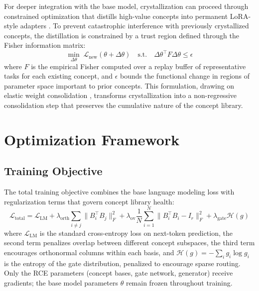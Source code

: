 \documentclass[11pt]{article}
\begin{document}
For deeper integration with the base model, crystallization can proceed through constrained optimization that distills high-value concepts into permanent LoRA-style adapters \cite{hu2022lora}. To prevent catastrophic interference with previously crystallized concepts, the distillation is constrained by a trust region defined through the Fisher information matrix:
\begin{equation}
\min_{\Delta\theta}\; \mathcal{L}_{\text{new}}(\theta + \Delta\theta) \quad \text{s.t.} \quad \Delta\theta^\top F \Delta\theta \leq \epsilon
\label{eq:crystal}
\end{equation}
where $F$ is the empirical Fisher computed over a replay buffer of representative tasks for each existing concept, and $\epsilon$ bounds the functional change in regions of parameter space important to prior concepts. This formulation, drawing on elastic weight consolidation \cite{kirkpatrick2017ewc}, transforms crystallization into a non-regressive consolidation step that preserves the cumulative nature of the concept library.

\section{Optimization Framework}

\subsection{Training Objective}

The total training objective combines the base language modeling loss with regularization terms that govern concept library health:
\begin{equation}
\mathcal{L}_{\text{total}} = \mathcal{L}_{\text{LM}} + \lambda_{\text{orth}} \sum_{i \neq j} \|B_i^\top B_j\|_F^2 + \lambda_{\text{ov}} \frac{1}{N}\sum_{i=1}^N \|B_i^\top B_i - I_r\|_F^2 + \lambda_{\text{gate}} \mathcal{H}(g)
\label{eq:total_loss}
\end{equation}
where $\mathcal{L}_{\text{LM}}$ is the standard cross-entropy loss on next-token prediction, the second term penalizes overlap between different concept subspaces, the third term encourages orthonormal columns within each basis, and $\mathcal{H}(g) = -\sum_{i} g_i \log g_i$ is the entropy of the gate distribution, penalized to encourage sparse routing. Only the RCE parameters (concept bases, gate network, generator) receive gradients; the base model parameters $\theta$ remain frozen throughout training.
\end{document}
